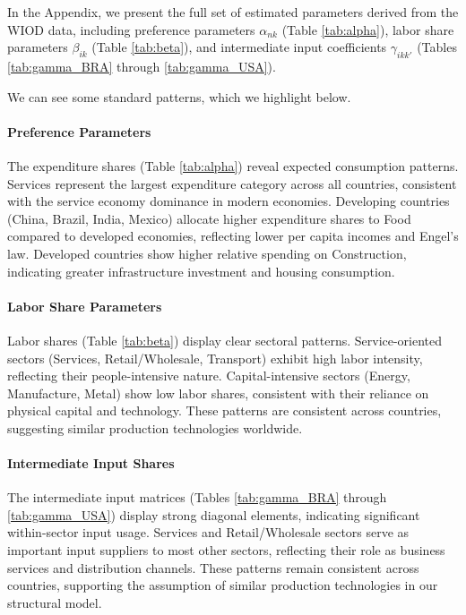 In the Appendix, we present the full set of estimated parameters derived from the WIOD data, including preference parameters $\alpha_{nk}$ (Table \ref{tab:alpha}), labor share parameters $\beta_{ik}$ (Table \ref{tab:beta}), and intermediate input coefficients $\gamma_{ikk'}$ (Tables \ref{tab:gamma_BRA} through \ref{tab:gamma_USA}). 

We can see some standard patterns, which we highlight below.

\paragraph{Preference Parameters} The expenditure shares (Table \ref{tab:alpha}) reveal expected consumption patterns. Services represent the largest expenditure category across all countries, consistent with the service economy dominance in modern economies. Developing countries (China, Brazil, India, Mexico) allocate higher expenditure shares to Food compared to developed economies, reflecting lower per capita incomes and Engel's law. Developed countries show higher relative spending on Construction, indicating greater infrastructure investment and housing consumption.

\paragraph{Labor Share Parameters} Labor shares (Table \ref{tab:beta}) display clear sectoral patterns. Service-oriented sectors (Services, Retail/Wholesale, Transport) exhibit high labor intensity, reflecting their people-intensive nature. Capital-intensive sectors (Energy, Manufacture, Metal) show low labor shares, consistent with their reliance on physical capital and technology. These patterns are consistent across countries, suggesting similar production technologies worldwide.

\paragraph{Intermediate Input Shares} The intermediate input matrices (Tables \ref{tab:gamma_BRA} through \ref{tab:gamma_USA}) display strong diagonal elements, indicating significant within-sector input usage. Services and Retail/Wholesale sectors serve as important input suppliers to most other sectors, reflecting their role as business services and distribution channels. These patterns remain consistent across countries, supporting the assumption of similar production technologies in our structural model.

